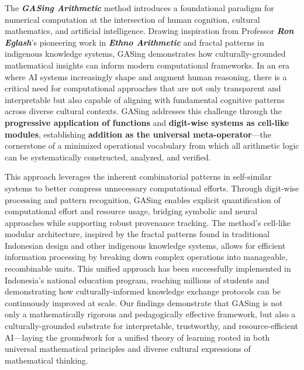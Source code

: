 The \textbf{\textit{GASing Arithmetic}} method introduces a foundational paradigm for numerical computation at the intersection of human cognition, cultural mathematics, and artificial intelligence. Drawing inspiration from Professor \textbf{\textit{Ron Eglash}}'s pioneering work in \textbf{\textit{Ethno Arithmetic}} and fractal patterns in indigenous knowledge systems, GASing demonstrates how culturally-grounded mathematical insights can inform modern computational frameworks. In an era where AI systems increasingly shape and augment human reasoning, there is a critical need for computational approaches that are not only transparent and interpretable but also capable of aligning with fundamental cognitive patterns across diverse cultural contexts. GASing addresses this challenge through the \textbf{progressive application of functions} and \textbf{digit-wise systems as cell-like modules}, establishing \textbf{addition as the universal meta-operator}—the cornerstone of a minimized operational vocabulary from which all arithmetic logic can be systematically constructed, analyzed, and verified. 

This approach leverages the inherent combinatorial patterns in self-similar systems to better compress unnecessary computational efforts. Through digit-wise processing and pattern recognition, GASing enables explicit quantification of computational effort and resource usage, bridging symbolic and neural approaches while supporting robust provenance tracking. The method's cell-like modular architecture, inspired by the fractal patterns found in traditional Indonesian design and other indigenous knowledge systems, allows for efficient information processing by breaking down complex operations into manageable, recombinable units. This unified approach has been successfully implemented in Indonesia's national education program, reaching millions of students and demonstrating how culturally-informed knowledge exchange protocols can be continuously improved at scale. Our findings demonstrate that GASing is not only a mathematically rigorous and pedagogically effective framework, but also a culturally-grounded substrate for interpretable, trustworthy, and resource-efficient AI—laying the groundwork for a unified theory of learning rooted in both universal mathematical principles and diverse cultural expressions of mathematical thinking.
